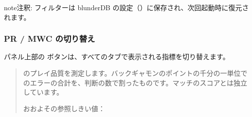 \documentclass[letterpaper,10pt,dvipdfmx]{sphinxmanual}
\begin{document}
\begin{sphinxadmonition}{note}{注釈:}
\sphinxAtStartPar
フィルターは blunderDB の設定（）に保存され、次回起動時に復元されます。
\end{sphinxadmonition}


\subsubsection{PR / MWC の切り替え}
\label{\detokenize{manuel:toggle-pr-mwc}}
\sphinxAtStartPar
パネル上部の  ボタンは、すべてのタブで表示される指標を切り替えます。

\sphinxAtStartPar
{}
\begin{quote}

\sphinxAtStartPar
{} のプレイ品質を測定します。バックギャモンのポイントの千分の一単位でのエラーの合計を、判断の数で割ったものです。マッチのスコアとは独立しています。

\sphinxAtStartPar
おおよその参照しきい値：



\end{quote}
\end{document}
